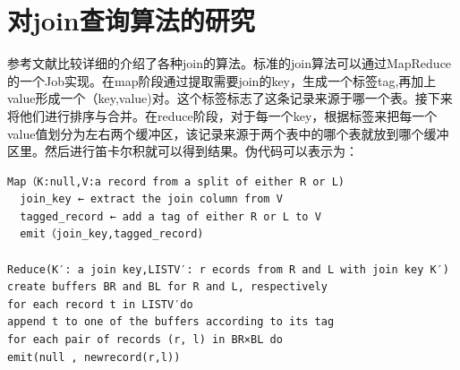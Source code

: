 \section{对join查询算法的研究}
参考文献\cite{join}比较详细的介绍了各种join的算法。标准的join算法可以通过MapReduce的一个Job实现。在map阶段通过提取需要join的key，生成一个标签tag,再加上value形成一个（key,value)对。这个标签标志了这条记录来源于哪一个表。接下来将他们进行排序与合并。在reduce阶段，对于每一个key，根据标签来把每一个value值划分为左右两个缓冲区，该记录来源于两个表中的哪个表就放到哪个缓冲区里。然后进行笛卡尔积就可以得到结果。伪代码可以表示为：
\begin{lstlisting}
Map（K:null,V:a record from a split of either R or L)
  join_key ← extract the join column from V
  tagged_record ← add a tag of either R or L to V
  emit（join_key,tagged_record)

Reduce(K′: a join key,LISTV′: r ecords from R and L with join key K′)
create buffers BR and BL for R and L, respectively
for each record t in LISTV′do
append t to one of the buffers according to its tag
for each pair of records (r, l) in BR×BL do
emit(null , newrecord(r,l))
\end{lstlisting}

